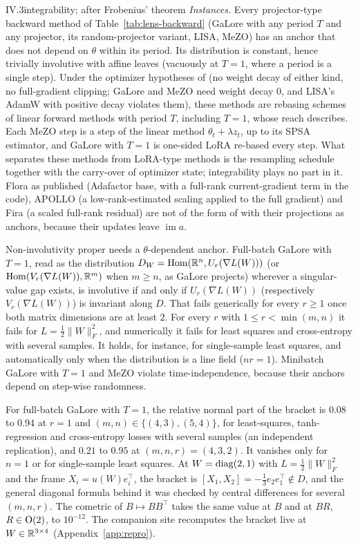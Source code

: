 \begin{proposition}{IV.3}{integrability; after Frobenius' theorem}
\emph{Instances.} Every projector-type backward method of Table~\ref{tab:lens-backward} (GaLore with any period $T$
and any projector, its random-projector variant, LISA, MeZO) has an anchor that does not depend on $\theta$ within its
period. Its distribution is constant, hence trivially involutive with affine leaves (vacuously at $T=1$, where a period
is a single step). Under the optimizer hypotheses of  (no weight decay of either kind, no
full-gradient clipping; GaLore and MeZO need weight decay $0$, and LISA's AdamW with positive decay violates them),
these methods are rebasing schemes of linear forward methods with period $T$, including $T=1$, whose reach
 describes. Each MeZO step is a step of the linear method $\theta_t+\lambda z_t$, up to its SPSA
estimator, and GaLore with $T=1$ is one-sided LoRA re-based every step. What separates these methods from LoRA-type
methods is the resampling schedule together with the carry-over of optimizer state; integrability plays no part in it.
Flora as published (Adafactor base, with a full-rank current-gradient term in the code), APOLLO (a
low-rank-estimated scaling applied to the full gradient) and Fira (a scaled full-rank residual) are not of the form of
 with their projections as anchors, because their updates leave $\operatorname{im}a$.

Non-involutivity proper needs a $\theta$-dependent anchor. Full-batch GaLore with $T=1$, read as the distribution
$D_W=\operatorname{Hom}(\mathbb{R}^n,U_r(\nabla L(W)))$ (or $\operatorname{Hom}(V_r(\nabla L(W)),\mathbb{R}^m)$ when $m\ge n$, as
GaLore projects) wherever a singular-value gap exists, is involutive if and only if $U_r(\nabla L(W))$ (respectively
$V_r(\nabla L(W))$) is invariant along $D$. That fails generically for every $r\ge1$ once both matrix dimensions are at
least $2$. For every $r$ with $1\le r<\min(m,n)$ it fails for $L=\tfrac12\lVert W\rVert_F^2$, and numerically it fails
for least squares and cross-entropy with several samples. It holds, for instance, for single-sample least squares, and
automatically only when the distribution is a line field ($nr=1$). Minibatch GaLore with $T=1$ and MeZO violate
time-independence, because their anchors depend on step-wise randomness.
\end{proposition}

\noindent{}\enspace For full-batch GaLore with $T=1$, the relative normal part of the bracket is $0.08$ to
$0.94$ at $r=1$ and $(m,n)\in\{(4,3),(5,4)\}$, for least-squares, tanh-regression and cross-entropy losses with several
samples (an independent replication), and $0.21$ to $0.95$ at $(m,n,r)=(4,3,2)$. It vanishes only for $n=1$ or for
single-sample least squares. At $W=\operatorname{diag}(2,1)$ with $L=\tfrac12\lVert W\rVert_F^2$ and the frame $X_i=u(W)e_i^\top$,
the bracket is $[X_1,X_2]=-\tfrac13e_2e_1^\top\notin D$, and the general diagonal formula behind it was checked by
central differences for several $(m,n,r)$. The cometric of $B\mapsto BB^\top$ takes the same value at $B$ and at $BR$,
$R\in\mathrm{O}(2)$, to $10^{-12}$. The companion site recomputes the bracket live at $W\in\mathbb{R}^{3\times4}$
(Appendix~\ref{app:repro}).

